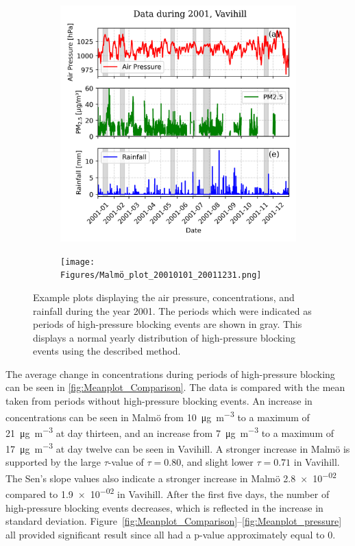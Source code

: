 \begin{figure}[H]
    \centering
    \begin{subfigure}[b]{0.49\textwidth}
        \centering
        \includegraphics[width=\textwidth]{Figures/Vavihill_plot_20010101_20011231.png}
        \label{fig:2001Vavihill}
    \end{subfigure}
    \hfill
    \begin{subfigure}[b]{0.49\textwidth}
        \centering
        \texttt{[image: Figures/Malmö\_plot\_20010101\_20011231.png]}
        \label{fig:2001Malmö}
    \end{subfigure}
    \caption{Example plots displaying the air pressure, \PM concentrations, and rainfall during the year 2001. The periods which were indicated as periods of high-pressure blocking events are shown in gray. This displays a normal yearly distribution of high-pressure blocking events using the described method.}
    \label{fig:2001}
\end{figure}

The average change in \PM concentrations during periods of high-pressure blocking can be seen in \autoref{fig:Meanplot_Comparison}. The data is compared with the \PM mean taken from periods without high-pressure blocking events. An increase in \PM concentrations can be seen in Malmö from \SI{10}{\micro\gram\per\meter\cubed} to a maximum of \SI{21}{\micro\gram\per\meter\cubed} at day thirteen, and an increase from \SI{7}{\micro\gram\per\meter\cubed} to a maximum of \SI{17}{\micro\gram\per\meter\cubed} at day twelve can be seen in Vavihill. A stronger increase in Malmö is supported by the large $\tau$-value of $\tau=0.80$, and slight lower $\tau=0.71$ in Vavihill. The Sen's slope values also indicate a stronger increase in Malmö \SI{2.8e-02}{} compared to \SI{1.9e-02}{} in Vavihill. After the first five days, the number of high-pressure blocking events decreases, which is reflected in the increase in standard deviation. Figure~\ref{fig:Meanplot_Comparison}--\ref{fig:Meanplot_pressure} all provided significant result since all had a p-value approximately equal to 0.


